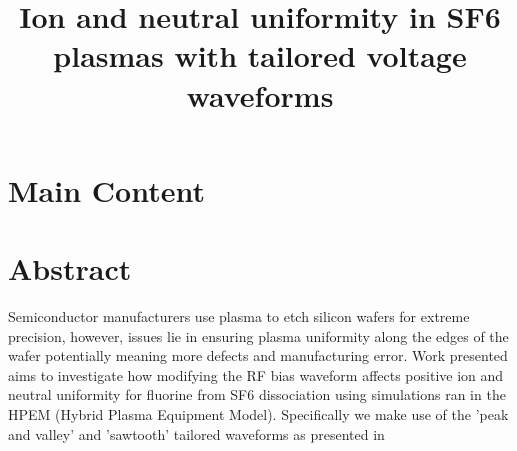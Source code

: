 \documentclass[12pt]{article}
\begin{document}
\title{Ion and neutral uniformity in SF6 plasmas with tailored voltage waveforms}


\submitdate{\today}
\maketitle

\addtocounter{page}{-1}
\thispagestyle{empty}



\newpage
\doublespacing
\tableofcontents
\singlespacing








\newpage
{}
\section*{Main Content}%

\section{Abstract} \label{Sec: Abstract}

Semiconductor manufacturers use plasma to etch silicon wafers for extreme precision, however, issues lie in ensuring plasma uniformity along the edges of the wafer potentially meaning more defects and manufacturing error. Work presented aims to investigate how modifying the RF bias waveform affects positive ion and neutral uniformity for fluorine from SF6 dissociation using simulations ran in the HPEM (Hybrid Plasma Equipment Model). Specifically we make use of the 'peak and valley' and 'sawtooth' tailored waveforms as presented in \cite{Doyle2020}
\end{document}
